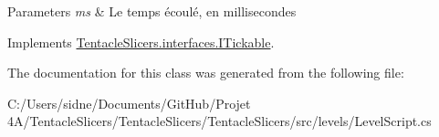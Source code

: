 \begin{DoxyParams}{Parameters}
{\em ms} & Le temps écoulé, en millisecondes \\
\hline
\end{DoxyParams}


Implements \hyperlink{interface_tentacle_slicers_1_1interfaces_1_1_i_tickable}{Tentacle\+Slicers.\+interfaces.\+I\+Tickable}.



The documentation for this class was generated from the following file\+:\begin{DoxyCompactItemize}
\item 
C\+:/\+Users/sidne/\+Documents/\+Git\+Hub/\+Projet 4\+A/\+Tentacle\+Slicers/\+Tentacle\+Slicers/\+Tentacle\+Slicers/src/levels/Level\+Script.\+cs\end{DoxyCompactItemize}
